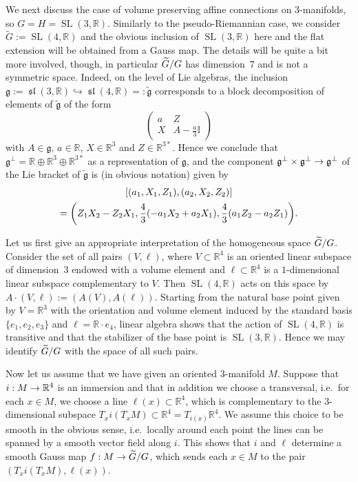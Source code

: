 \documentclass[AHL,Unicode,longabstracts]{cedram}
\newcommand{\x}{\times}
\DeclareMathOperator{\SL}{SL}
\DeclareMathOperator{\fksl}{\mathfrak{sl}}
\newcommand*{\R}{\mathbb{R}}
\newcommand{\bbI}{\mathbb{I}}
\newcommand{\tfg}{\widetilde{\mathfrak g}}
\newcommand{\fkg}{\mathfrak{g}}
\renewcommand*{\to}{\mathchoice{\longrightarrow}{\rightarrow}{\rightarrow}{\rightarrow}}
\let\originalleft\left
\let\originalright\right
\renewcommand{\left}{\mathopen{}\mathclose\bgroup\originalleft}
\renewcommand{\right}{\aftergroup\egroup\originalright}
\let\oldtilde\tilde
\renewcommand*{\tilde}[1]{\mathchoice{\widetilde{#1}}{\widetilde{#1}}{\oldtilde{#1}}{\oldtilde{#1}}}
\newcommand*{\R}{\mathbb{R}}
\begin{document}
We next discuss the case of volume preserving affine connections on $3$-manifolds, so $G=H=\SL(3,\R)$. Similarly to the pseudo-Riemannian case, we consider $\widetilde{G}:=\SL(4,\R)$ and the obvious inclusion of $\SL(3,\R)$ here and the flat extension will be obtained from a Gauss map. The details will be quite a bit more involved, though, in particular $\tilde G/G$ has dimension~$7$ and is not a symmetric space. Indeed, on the level of Lie algebras, the inclusion $\fkg:=\fksl(3,\R)\hookrightarrow
\fksl(4,\R)=:\tfg$ corresponds to a block decomposition of elements of $\tfg$ of the form
\[
\begin{pmatrix}
a & Z \\ 
X & A-\frac{a}{3}\bbI
\end{pmatrix}
\]
with $A\in\fkg$, $a\in\R$, $X\in\R^3$ and $Z\in\R^{3*}$. Hence we conclude that $\fkg^\perp=\R\oplus\R^3\oplus\R^{3*}$ as a representation of $\fkg$, and the component $\fkg^\perp\x\fkg^\perp\to\fkg^\perp$ of the Lie bracket of $\tfg$ is (in obvious notation) given by
\begin{multline}\label{eq:non-symm}
[(a_1,X_1,Z_1),(a_2,X_2,Z_2)]\\
=\left(Z_1X_2-Z_2X_1,\frac43(-a_1X_2+a_2X_1),\frac43(a_1Z_2-a_2Z_1)\right).
\end{multline}

Let us first give an appropriate interpretation of the homogeneous space $\tilde G/G$. Consider the set of all pairs $(V,\ell)$, where $V\subset\R^4$ is an oriented linear subspace of dimension~$3$ endowed with a volume element and $\ell\subset\R^4$ is a $1$-dimensional linear subspace complementary to $V$. Then $\SL(4,\R)$ acts on this space by $A\cdot (V,\ell):=(A(V),A(\ell))$. Starting from the natural base point given by $V=\R^3$ with the orientation and volume element induced by the standard basis $\{e_1,e_2,e_3\}$ and $\ell=\R\cdot e_4$, linear algebra shows that the action of $\SL(4,\R)$ is transitive and that the stabilizer of the base point is $\SL(3,\R)$. Hence we may identify $\tilde G/G$ with the space of all such pairs.

Now let us assume that we have given an oriented $3$-manifold $M$. Suppose that $i: M\to\R^4$ is an immersion and that in addition we choose a transversal, i.e.~for each $x\in M$, we choose a line $\ell(x)\subset\R^4$, which is complementary to the $3$-dimensional subspace $T_xi(T_xM)\subset\R^4=T_{i(x)}\R^4$. We assume this choice to be smooth in the obvious sense, i.e.~locally around each point the lines can be spanned by a smooth vector field along $i$. This shows that $i$ and $\ell$ determine a smooth Gauss map $f: M\to\tilde G/G$, which sends each $x\in M$ to the pair $(T_xi(T_xM),\ell(x))$.
\end{document}
